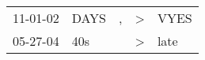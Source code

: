 \begin{supertabular}{p{0.07\textwidth}p{0.06\textwidth}p{0.02\textwidth}p{0.02\textwidth}p{0.06\textwidth}}
 11-01-02\textsuperscript{} &  DAYS\textsuperscript{} &  , &  \textgreater &  VYES\textsuperscript{} \\
 05-27-04\textsuperscript{} &   40s\textsuperscript{} &    &  \textgreater &  late\textsuperscript{} \\
\end{supertabular}
